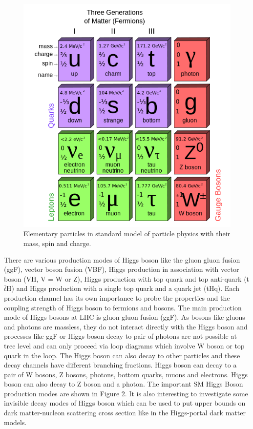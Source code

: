 \documentclass[final,3p]{CSP}
\begin{document}
\begin{figure}[H]
	\centering
	\includegraphics[scale=0.4]{./cd11.png}
	\caption{Elementary particles in standard model of particle physics with their mass, spin and charge.}
	\label{figure 1}
\end{figure}


There are various production modes of Higgs boson like the gluon gluon fusion (ggF), vector boson fusion (VBF), Higgs 
production in association with vector boson (VH, V = W or Z), Higgs production with top quark and top anti-quark (t$\bar{t}$H) and Higgs 
production with a single top quark and a quark jet (tHq). Each production channel has its own importance to probe the 
properties and the coupling strength of Higgs boson to fermions and bosons. The main production mode of Higgs bosons at LHC is 
gluon gluon fusion (ggF). As bosons like gluons and photons are massless, they do not interact directly with the Higgs boson 
and processes like ggF or Higgs boson decay to pair of photons are not possible at tree level and can only proceed via loop 
diagrams which involve W boson or top quark in the loop. The Higgs boson can also decay to other particles and these decay 
channels have different branching fractions. Higgs boson can decay to a pair of W bosons, Z bosons, photons, bottom quarks, 
muons and electrons. Higgs boson can also decay to Z boson and a photon. The important SM Higgs Boson production modes are shown in Figure 2. It is also interesting to investigate some invisible 
decay modes of Higgs boson which can be used to put upper bounds on dark matter-nucleon scattering cross section like in the 
Higgs-portal dark matter models.
\end{document}

